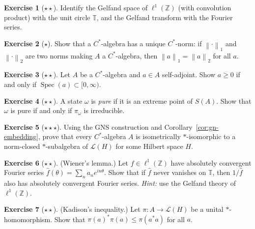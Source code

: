 \documentclass[a4paper,12pt]{book}
\DeclareMathOperator{\Spec}{Spec}
\newcommand{\Z}{\mathbb{Z}}
\newcommand{\norm}[1]{\left\| #1 \right\|}
\theoremstyle{definition}
\newtheorem{exercise}{Exercise}[chapter]
\theoremstyle{plain}
\theoremstyle{remark}
\begin{document}
\begin{exercise}[$\star\star$]\label{exo:gelfand-ell1}
\index{Gelfand transform!of $\ell^1(\Z)$}
Identify the Gelfand space of $\ell^1(\Z)$ (with convolution product) with the
unit circle $\mathbb{T}$, and the Gelfand transform with the Fourier series.
\end{exercise}

\begin{exercise}[$\star$]\label{exo:cstar-norm-unique}
Show that a $C^*$-algebra has a unique $C^*$-norm: if $\norm{\cdot}_1$ and
$\norm{\cdot}_2$ are two norms making $A$ a $C^*$-algebra, then
$\norm{a}_1 = \norm{a}_2$ for all $a$.
\end{exercise}

\begin{exercise}[$\star\star$]\label{exo:cstar-positive}
Let $A$ be a $C^*$-algebra and $a \in A$ self-adjoint. Show $a \ge 0$ if and
only if $\Spec(a) \subset [0, \infty)$.
\end{exercise}

\begin{exercise}[$\star\star$]\label{exo:pure-state}
A state $\omega$ is \emph{pure} if it is an extreme point of $S(A)$. Show that
$\omega$ is pure if and only if $\pi_\omega$ is irreducible.
\end{exercise}

\begin{exercise}[$\star\star\star$]\label{exo:gelfand-naimark-noncommutative}
Using the GNS construction and Corollary~\ref{cor:gn-embedding}, prove that
every $C^*$-algebra $A$ is isometrically $*$-isomorphic to a norm-closed
$*$-subalgebra of $\mathcal{L}(H)$ for some Hilbert space $H$.
\end{exercise}

\begin{exercise}[$\star\star$]\label{exo:wiener-lemma}
(Wiener's lemma.) Let $f \in \ell^1(\Z)$ have absolutely convergent Fourier
series $\hat{f}(\theta) = \sum_n a_n e^{in\theta}$. Show that if $\hat{f}$
never vanishes on $\mathbb{T}$, then $1/\hat{f}$ also has absolutely convergent
Fourier series. \emph{Hint:} use the Gelfand theory of $\ell^1(\Z)$.
\end{exercise}

\begin{exercise}[$\star\star$]\label{exo:kadison}
(Kadison's inequality.) Let $\pi \colon A \to \mathcal{L}(H)$ be a unital
$*$-homomorphism. Show that $\pi(a)^*\pi(a) \le \pi(a^*a)$ for all $a$.
\end{exercise}
\end{document}
